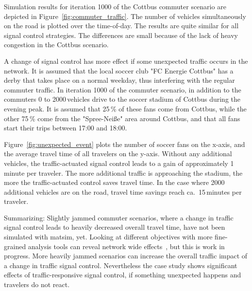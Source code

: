 Simulation results for iteration 1000 of the Cottbus commuter scenario are depicted in Figure~\ref{fig:commuter_traffic}. The number of vehicles simultaneously on the road is plotted over the time-of-day. The results are quite similar for all signal control strategies. The differences are small because of the lack of heavy congestion in the Cottbus scenario. 

A change of signal control has more effect if some unexpected traffic occurs in the network. It is assumed that the local soccer club "FC Energie Cottbus" has a derby that takes place on a normal weekday, thus interfering with the regular commuter traffic. In iteration 1000 of the commuter scenario, in addition to the commuters 0 to 2000\,vehicles drive to the soccer stadium of Cottbus during the evening peak. It is assumed that 25\,\% of these fans come from Cottbus, while the other 75\,\% come from the "Spree-Nei{\ss}e" area around Cottbus, and that all fans start their trips between 17:00 and 18:00. 

Figure~\ref{fig:unexpected_event} plots the number of soccer fans on the x-axis, and the average travel time of all travelers on the y-axis. Without any additional vehicles, the traffic-actuated signal control leads to a gain of approximately 1\,minute per traveler. The more additional traffic is approaching the stadium, the more the traffic-actuated control saves travel time. In the case where 2000\,additional vehicles are on the road, travel time savings reach ca.~15\,minutes per traveler. 

Summarizing: Slightly jammed commuter scenarios, where a change in traffic signal control leads to heavily decreased overall travel time, have not been simulated with \gls{matsim}, yet. Looking at different objectives with more fine-grained analysis tools can reveal network wide effects~\citep[e.g.,\,see the analysis using macroscopic fundamental diagrams][pp.114]{Grether2014PhD}, but this is work in progress. More heavily jammed scenarios can increase the overall traffic impact of a change in traffic signal control. Nevertheless the case study shows significant effects of traffic-responsive signal control, if something unexpected happens and travelers do not react.  

